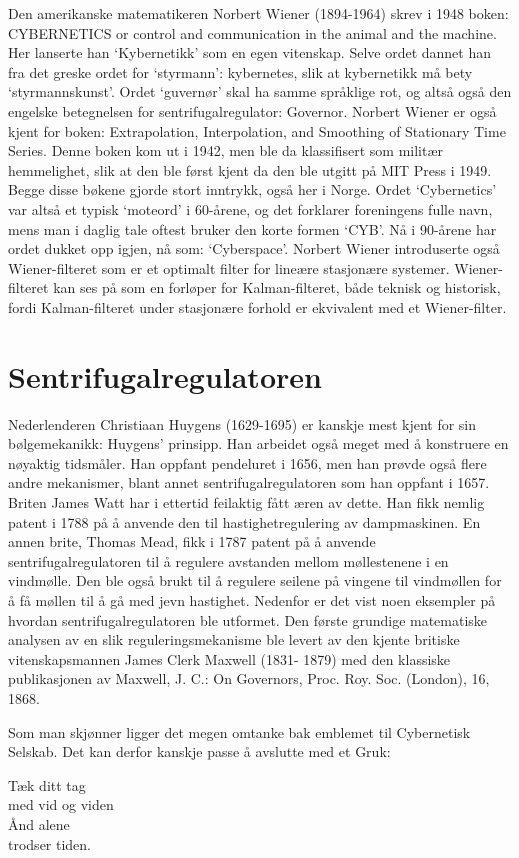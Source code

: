 Den amerikanske matematikeren Norbert Wiener (1894-1964) skrev i 1948 boken: CYBERNETICS or control and communication in the animal and the machine. Her lanserte han `Kybernetikk' som en egen vitenskap. Selve ordet dannet han fra det greske ordet for `styrmann': kybernetes, slik at kybernetikk må bety `styrmannskunst'. Ordet `guvernør' skal ha samme språklige rot, og altså også den engelske betegnelsen for sentrifugalregulator: Governor. Norbert Wiener er også kjent for boken: Extrapolation, Interpolation, and Smoothing of Stationary Time Series. Denne boken kom ut i 1942, men ble da klassifisert som militær hemmelighet, slik at den ble først kjent da den ble utgitt på MIT Press i 1949. Begge disse bøkene gjorde stort inntrykk, også her i Norge. Ordet `Cybernetics' var altså et typisk `moteord' i 60-årene, og det forklarer foreningens fulle navn, mens man i daglig tale oftest bruker den korte formen `CYB'. Nå i 90-årene har ordet dukket opp igjen, nå som: `Cyberspace'. Norbert Wiener introduserte også Wiener-filteret som er et optimalt filter for lineære stasjonære systemer. Wiener-filteret kan ses på som en forløper for Kalman-filteret, både teknisk og historisk, fordi Kalman-filteret under stasjonære forhold er ekvivalent med et Wiener-filter.

\section{Sentrifugalregulatoren}

Nederlenderen Christiaan Huygens (1629-1695) er kanskje mest kjent for sin bølgemekanikk: Huygens' prinsipp. Han arbeidet også meget med å konstruere en nøyaktig tidsmåler. Han oppfant pendeluret i 1656, men han prøvde også flere andre mekanismer, blant annet sentrifugalregulatoren som han oppfant i 1657. Briten James Watt har i ettertid feilaktig fått æren av dette. Han fikk nemlig patent i 1788 på å anvende den til hastighetregulering av dampmaskinen. En annen brite, Thomas Mead, fikk i 1787 patent på å anvende sentrifugalregulatoren til å regulere avstanden mellom møllestenene i en vindmølle. Den ble også brukt til å regulere seilene på vingene til vindmøllen for å få møllen til å gå med jevn hastighet. Nedenfor er det vist noen eksempler på hvordan sentrifugalregulatoren ble utformet. Den første grundige matematiske analysen av en slik reguleringsmekanisme ble levert av den kjente britiske vitenskapsmannen James Clerk Maxwell (1831- 1879) med den klassiske publikasjonen av Maxwell, J. C.: On Governors, Proc. Roy. Soc. (London), 16, 1868.


Som man skjønner ligger det megen omtanke bak emblemet til Cybernetisk Selskab. Det kan derfor kanskje passe å avslutte med et Gruk:

\begin{center}
Tæk ditt tag\\
med vid og viden\\
Ånd alene\\
trodser tiden.
\end{center}
